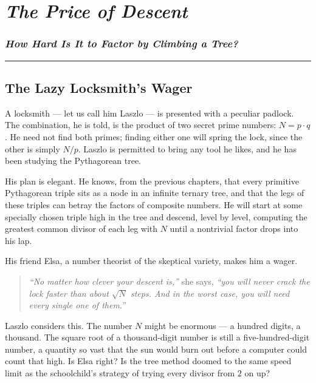 \chapter{\texorpdfstring{\emph{The Price of Descent}}{The Price of Descent}}
\subsection{\texorpdfstring{\emph{How Hard Is It to Factor by Climbing a Tree?}}{How Hard Is It to Factor by Climbing a Tree?}}
\bigskip\noindent\rule{\linewidth}{0.4pt}\bigskip

\section{The Lazy Locksmith's Wager}
A locksmith --- let us call him Laszlo --- is presented with a peculiar padlock. The combination, he is told, is the product of two secret prime numbers: \(N = p \cdot q\). He need not find both primes; finding either one will spring the lock, since the other is simply \(N / p\). Laszlo is permitted to bring any tool he likes, and he has been studying the Pythagorean tree.

His plan is elegant. He knows, from the previous chapters, that every primitive Pythagorean triple sits as a node in an infinite ternary tree, and that the legs of these triples can betray the factors of composite numbers. He will start at some specially chosen triple high in the tree and descend, level by level, computing the greatest common divisor of each leg with \(N\) until a nontrivial factor drops into his lap.

His friend Elsa, a number theorist of the skeptical variety, makes him a wager.

\begin{quote}
\emph{``No matter how clever your descent is,''} she says, \emph{``you will never crack the lock faster than about \(\sqrt{N}\) steps. And in the worst case, you will need every single one of them.''}
\end{quote}

Laszlo considers this. The number \(N\) might be enormous --- a hundred digits, a thousand. The square root of a thousand-digit number is still a five-hundred-digit number, a quantity so vast that the sun would burn out before a computer could count that high. Is Elsa right? Is the tree method doomed to the same speed limit as the schoolchild's strategy of trying every divisor from \(2\) on up?

